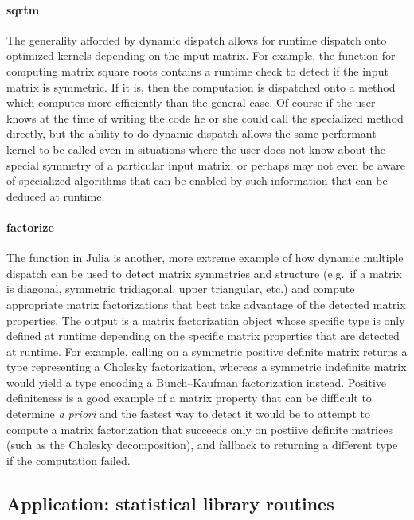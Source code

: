 \documentclass[pldi]{sigplanconf-pldi15}
\begin{document}
\paragraph{sqrtm}
The generality afforded by dynamic dispatch allows for runtime dispatch onto
optimized kernels depending on the input matrix. For example, the
 function for computing matrix square roots contains a
runtime check to detect if the input matrix is symmetric. If it is, then the
computation is dispatched onto a  method which
computes more efficiently than the general case. Of course if the user knows at
the time of writing the code he or she could call the specialized method
directly, but the ability to do dynamic dispatch allows the same performant
kernel to be called even in situations where the user does not know about the
special symmetry of a particular input matrix, or perhaps may not even be aware
of specialized algorithms that can be enabled by such information that can be
deduced at runtime.

\paragraph{factorize}
The  function in Julia is another, more extreme example of how
dynamic multiple dispatch can be used to detect matrix symmetries and structure
(e.g.\ if a matrix is diagonal, symmetric tridiagonal, upper triangular, etc.)
and compute appropriate matrix factorizations that best take advantage of the
detected matrix properties. The output is a matrix factorization object whose
specific type is only defined at runtime depending on the specific matrix
properties that are detected at runtime. For example, calling 
on a symmetric positive definite matrix returns a  type
representing a Cholesky factorization, whereas a symmetric indefinite matrix
would yield a  type encoding a Bunch--Kaufman factorization
instead. Positive definiteness is a good example of a matrix property that can
be difficult to determine \textit{a priori} and the fastest way to detect it
would be to attempt to compute a matrix factorization that succeeds only on
postiive definite matrices (such as the Cholesky decomposition), and fallback
to returning a different type if the computation failed.


\subsection{Application: statistical library routines}
\end{document}

